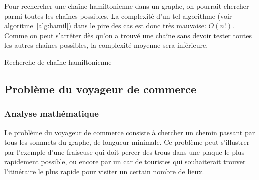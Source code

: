     Pour rechercher une chaîne hamiltonienne dans un graphe, on pourrait
    chercher parmi toutes les chaînes possibles. La complexité d'un tel
    algorithme (voir algoritme~\ref{alg:hamil}) dans le pire des cas est donc
    très mauvaise: $O(n!)$. Comme on peut s'arrêter dès qu'on a trouvé une
    chaîne sans devoir tester toutes les autres chaînes possibles, la
    complexité moyenne sera inférieure.

    \begin{algorithm}

      \caption{Recherche de chaîne hamiltonienne}
      \label{alg:hamil}
    \end{algorithm}

\subsection{Problème du voyageur de commerce}\label{sec:tsp}
  \subsubsection{Analyse mathématique}
    Le problème du voyageur de commerce consiste à chercher un chemin passant
    par tous les sommets du graphe, de longueur minimale.
    Ce problème peut s'illustrer par l'exemple d'une
    fraiseuse qui doit percer des trous dans une plaque le plus
    rapidement possible, ou encore par un car de touristes qui souhaiterait
    trouver l'itinéraire le plus rapide pour visiter un certain nombre de lieux.


